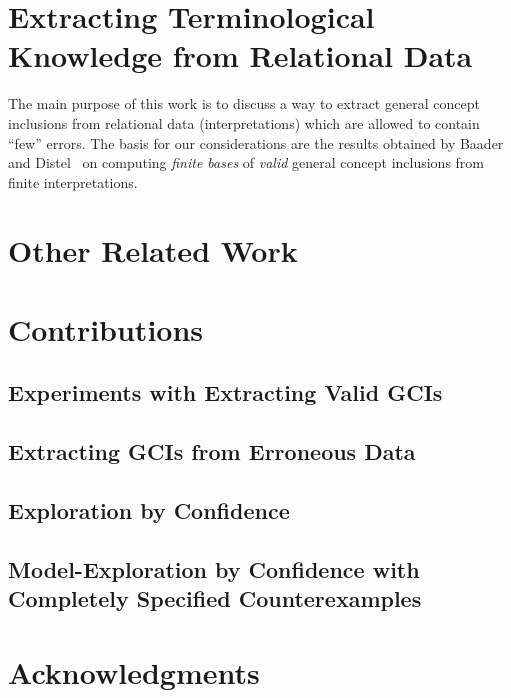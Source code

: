 \section{Extracting Terminological Knowledge from Relational Data}
\label{sec:extr-term-knowl}

The main purpose of this work is to discuss a way to extract general concept inclusions
from relational data (interpretations) which are allowed to contain \enquote{few} errors.
The basis for our considerations are the results obtained by Baader and
Distel~\cite{Diss-Felix,BaDi09,BaaderDistel08} on computing \emph{finite bases} of
\emph{valid} general concept inclusions from finite interpretations.

%
%

\section{Other Related Work}
\label{sec:related-work}

%
%
%

\section{Contributions}
\label{sec:contributions}


\subsection{Experiments with Extracting Valid GCIs}
\label{sec:exper-with-extr}

\subsection{Extracting GCIs from Erroneous Data}
\label{sec:extracting-gcis-from}

\subsection{Exploration by Confidence}
\label{sec:expl-conf-2}

\subsection{Model-Exploration by Confidence with Completely Specified Counterexamples}
\label{sec:model-expl-conf}

\section{Acknowledgments}
\label{sec:acknowledgements}


